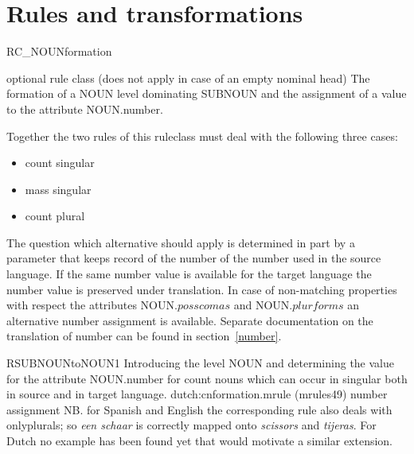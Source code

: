 \section{Rules and transformations}


\begin{mruleclass}{RC\_NOUNformation}
\begin{classdescr}
\kind optional rule class (does not apply in case of an empty nominal head)
\classtask The formation of a NOUN level dominating SUBNOUN and the
assignment of a value to the attribute NOUN.number.
\classremarks

Together the two rules of this ruleclass must deal with the following three 
cases:\\
\begin{itemize}
  \item count singular
  \item mass singular
  \item count plural
\end{itemize}

\noindent
The question which alternative should apply is determined in part
by a parameter that keeps record of the number of the 
number used in the source language. If the same number value is available for 
the target language the number value is preserved under translation. 
In case of non-matching properties with respect the attributes NOUN.$posscomas$
and NOUN.$plurforms$ an alternative number assignment is available.
Separate documentation on the translation of number can be found in 
section~\ref{number}.

\nofilters

\nospeedrules

\noplannedrules

\norulesnotince


\end{classdescr}

\begin{members}

\begin{member}
 RSUBNOUNtoNOUN1
 Introducing the level NOUN and determining the value for the 
attribute NOUN.number for 
count nouns which can occur in singular both in source and
in target language.
\file dutch:cnformation.mrule (mrules49)
\semantics number assignment
\remarks\mbox{}
NB. for Spanish and English the corresponding 
rule also deals with onlyplurals; so {\em een
schaar} is correctly mapped onto {\em scissors}
                             and {\em tijeras}. 
For Dutch no  example has been 
found yet that would motivate a similar
extension.


\end{member}
\end{members}
\end{mruleclass}
